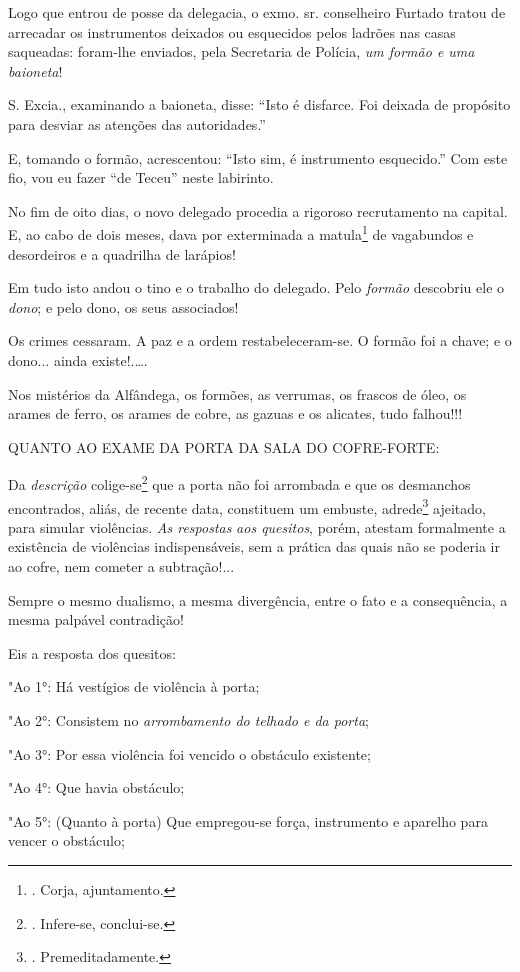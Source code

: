 Logo que entrou de posse da delegacia, o exmo. sr. conselheiro Furtado
tratou de arrecadar os instrumentos deixados ou esquecidos pelos ladrões
nas casas saqueadas: foram-lhe enviados, pela Secretaria de Polícia,
\emph{um formão e uma baioneta}!

S. Excia., examinando a baioneta, disse: ``Isto é disfarce. Foi deixada
de propósito para desviar as atenções das autoridades.''

E, tomando o formão, acrescentou: ``Isto sim, é instrumento esquecido.''
Com este fio, vou eu fazer ``de Teceu'' neste labirinto.

No fim de oito dias, o novo delegado procedia a rigoroso recrutamento na
capital. E, ao cabo de dois meses, dava por exterminada a
matula\footnote{. Corja, ajuntamento.} de vagabundos e desordeiros e a
quadrilha de larápios!

Em tudo isto andou o tino e o trabalho do delegado. Pelo \emph{formão}
descobriu ele o \emph{dono}; e pelo dono, os seus associados!

Os crimes cessaram. A paz e a ordem restabeleceram-se. O formão foi a
chave; e o dono... ainda existe!.\ldots{}.

Nos mistérios da Alfândega, os formões, as verrumas, os frascos de óleo,
os arames de ferro, os arames de cobre, as gazuas e os alicates, tudo
falhou!!!

QUANTO AO EXAME DA PORTA DA SALA DO COFRE-FORTE:

Da \emph{descrição} colige-se\footnote{. Infere-se, conclui-se.} que a
porta não foi arrombada e que os desmanchos encontrados, aliás, de
recente data, constituem um embuste, adrede\footnote{. Premeditadamente.}
ajeitado, para simular violências. \emph{As respostas} \emph{aos
quesitos}, porém, atestam formalmente a existência de violências
indispensáveis, sem a prática das quais não se poderia ir ao cofre, nem
cometer a subtração!...

Sempre o mesmo dualismo, a mesma divergência, entre o fato e a
consequência, a mesma palpável contradição!

Eis a resposta dos quesitos:

"Ao 1°: Há vestígios de violência à porta;

"Ao 2°: Consistem no \emph{arrombamento do telhado e da porta};

"Ao 3°: Por essa violência foi vencido o obstáculo existente;

"Ao 4°: Que havia obstáculo;

"Ao 5°: (Quanto à porta) Que empregou-se força, instrumento e aparelho
para vencer o obstáculo;


